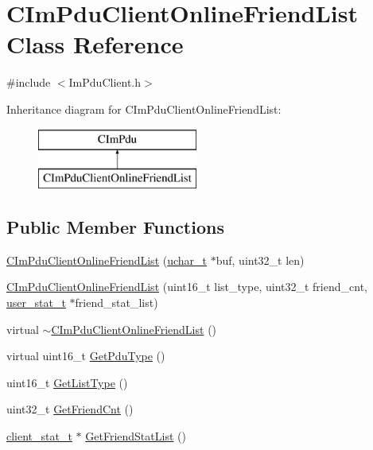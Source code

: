 \hypertarget{class_c_im_pdu_client_online_friend_list}{}\section{C\+Im\+Pdu\+Client\+Online\+Friend\+List Class Reference}
\label{class_c_im_pdu_client_online_friend_list}


{\ttfamily \#include $<$Im\+Pdu\+Client.\+h$>$}

Inheritance diagram for C\+Im\+Pdu\+Client\+Online\+Friend\+List\+:\begin{figure}[H]
\begin{center}
\leavevmode
\includegraphics[height=2.000000cm]{class_c_im_pdu_client_online_friend_list}
\end{center}
\end{figure}
\subsection*{Public Member Functions}
\begin{DoxyCompactItemize}
\item 
\hyperlink{class_c_im_pdu_client_online_friend_list_a5f565ecc8270bf2b430d657f8bff6bd9}{C\+Im\+Pdu\+Client\+Online\+Friend\+List} (\hyperlink{base_2ostype_8h_a124ea0f8f4a23a0a286b5582137f0b8d}{uchar\+\_\+t} $\ast$buf, uint32\+\_\+t len)
\item 
\hyperlink{class_c_im_pdu_client_online_friend_list_a4872935e7acb5b6d87b91d59957144ca}{C\+Im\+Pdu\+Client\+Online\+Friend\+List} (uint16\+\_\+t list\+\_\+type, uint32\+\_\+t friend\+\_\+cnt, \hyperlink{structuser__stat__t}{user\+\_\+stat\+\_\+t} $\ast$friend\+\_\+stat\+\_\+list)
\item 
virtual \hyperlink{class_c_im_pdu_client_online_friend_list_a7d717905b506ab39dbbe02f1d3ddea5d}{$\sim$\+C\+Im\+Pdu\+Client\+Online\+Friend\+List} ()
\item 
virtual uint16\+\_\+t \hyperlink{class_c_im_pdu_client_online_friend_list_a1cef54de73752b8167a89605ddff9ee6}{Get\+Pdu\+Type} ()
\item 
uint16\+\_\+t \hyperlink{class_c_im_pdu_client_online_friend_list_aff97a410468500497bf5854752cba402}{Get\+List\+Type} ()
\item 
uint32\+\_\+t \hyperlink{class_c_im_pdu_client_online_friend_list_a834e882b114217c4930b1be100373f83}{Get\+Friend\+Cnt} ()
\item 
\hyperlink{structclient__stat__t}{client\+\_\+stat\+\_\+t} $\ast$ \hyperlink{class_c_im_pdu_client_online_friend_list_ae23f692140959e1cbcc3e389f875af23}{Get\+Friend\+Stat\+List} ()
\end{DoxyCompactItemize}
